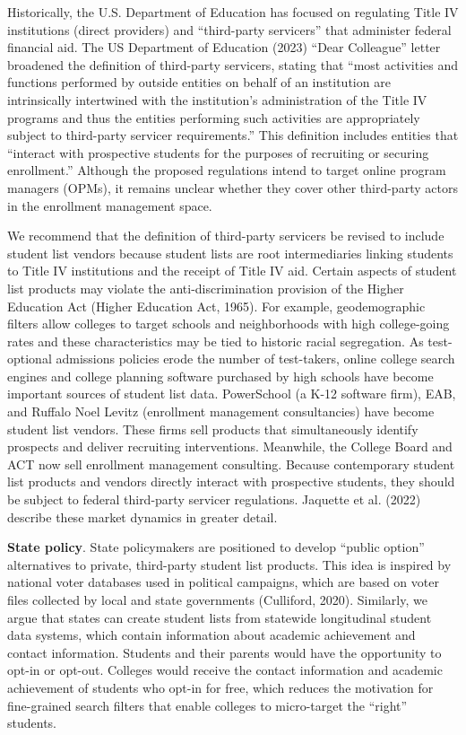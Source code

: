 \documentclass[
  12pt,
]{article}
\begin{document}
Historically, the U.S. Department of Education has focused on regulating Title IV institutions (direct providers) and ``third-party servicers'' that administer federal financial aid. The US Department of Education (2023) ``Dear Colleague'' letter broadened the definition of third-party servicers, stating that ``most activities and functions performed by outside entities on behalf of an institution are intrinsically intertwined with the institution's administration of the Title IV programs and thus the entities performing such activities are appropriately subject to third-party servicer requirements.'' This definition includes entities that ``interact with prospective students for the purposes of recruiting or securing enrollment.'' Although the proposed regulations intend to target online program managers (OPMs), it remains unclear whether they cover other third-party actors in the enrollment management space.

We recommend that the definition of third-party servicers be revised to include student list vendors because student lists are root intermediaries linking students to Title IV institutions and the receipt of Title IV aid. Certain aspects of student list products may violate the anti-discrimination provision of the Higher Education Act (Higher Education Act, 1965). For example, geodemographic filters allow colleges to target schools and neighborhoods with high college-going rates and these characteristics may be tied to historic racial segregation. As test-optional admissions policies erode the number of test-takers, online college search engines and college planning software purchased by high schools have become important sources of student list data. PowerSchool (a K-12 software firm), EAB, and Ruffalo Noel Levitz (enrollment management consultancies) have become student list vendors. These firms sell products that simultaneously identify prospects and deliver recruiting interventions. Meanwhile, the College Board and ACT now sell enrollment management consulting. Because contemporary student list products and vendors directly interact with prospective students, they should be subject to federal third-party servicer regulations. Jaquette et al. (2022) describe these market dynamics in greater detail.

\textbf{State policy}. State policymakers are positioned to develop ``public option'' alternatives to private, third-party student list products. This idea is inspired by national voter databases used in political campaigns, which are based on voter files collected by local and state governments (Culliford, 2020). Similarly, we argue that states can create student lists from statewide longitudinal student data systems, which contain information about academic achievement and contact information. Students and their parents would have the opportunity to opt-in or opt-out. Colleges would receive the contact information and academic achievement of students who opt-in for free, which reduces the motivation for fine-grained search filters that enable colleges to micro-target the ``right'' students.
\end{document}
